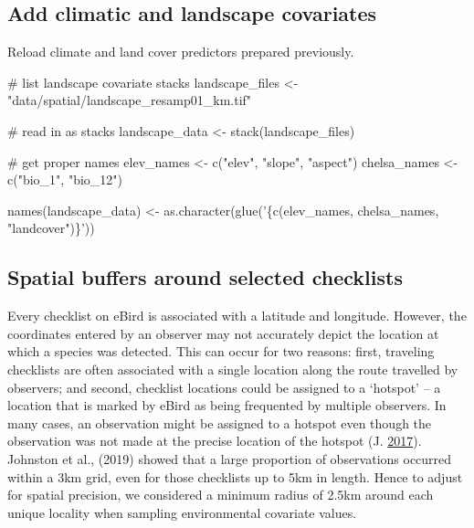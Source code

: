 \documentclass[
]{article}
\newenvironment{Shaded}{}{}
\newcommand{\CommentTok}[1]{\textcolor[rgb]{0.00,0.50,0.00}{#1}}
\newcommand{\KeywordTok}[1]{\textcolor[rgb]{0.00,0.00,1.00}{#1}}
\newcommand{\NormalTok}[1]{#1}
\newcommand{\StringTok}[1]{\textcolor[rgb]{0.00,0.50,0.50}{#1}}
\begin{document}
\hypertarget{add-climatic-and-landscape-covariates}{%
\subsection{Add climatic and landscape covariates}\label{add-climatic-and-landscape-covariates}}

Reload climate and land cover predictors prepared previously.

\begin{Shaded}
\begin{Highlighting}[]
\CommentTok{# list landscape covariate stacks}
\NormalTok{landscape_files <-}\StringTok{ "data/spatial/landscape_resamp01_km.tif"}

\CommentTok{# read in as stacks}
\NormalTok{landscape_data <-}\StringTok{ }\KeywordTok{stack}\NormalTok{(landscape_files)}

\CommentTok{# get proper names}
\NormalTok{elev_names <-}\StringTok{ }\KeywordTok{c}\NormalTok{(}\StringTok{"elev"}\NormalTok{, }\StringTok{"slope"}\NormalTok{, }\StringTok{"aspect"}\NormalTok{)}
\NormalTok{chelsa_names <-}\StringTok{ }\KeywordTok{c}\NormalTok{(}\StringTok{"bio_1"}\NormalTok{, }\StringTok{"bio_12"}\NormalTok{)}

\KeywordTok{names}\NormalTok{(landscape_data) <-}\StringTok{ }\KeywordTok{as.character}\NormalTok{(}\KeywordTok{glue}\NormalTok{(}\StringTok{'\{c(elev_names, chelsa_names, "landcover")\}'}\NormalTok{))}
\end{Highlighting}
\end{Shaded}

\hypertarget{spatial-buffers-around-selected-checklists}{%
\subsection{Spatial buffers around selected checklists}\label{spatial-buffers-around-selected-checklists}}

Every checklist on eBird is associated with a latitude and longitude. However, the coordinates entered by an observer may not accurately depict the location at which a species was detected. This can occur for two reasons: first, traveling checklists are often associated with a single location along the route travelled by observers; and second, checklist locations could be assigned to a `hotspot' -- a location that is marked by eBird as being frequented by multiple observers. In many cases, an observation might be assigned to a hotspot even though the observation was not made at the precise location of the hotspot (J. \protect\hyperlink{ref-praveenj.2017}{2017}). Johnston et al., (2019) showed that a large proportion of observations occurred within a 3km grid, even for those checklists up to 5km in length. Hence to adjust for spatial precision, we considered a minimum radius of 2.5km around each unique locality when sampling environmental covariate values.
\end{document}
